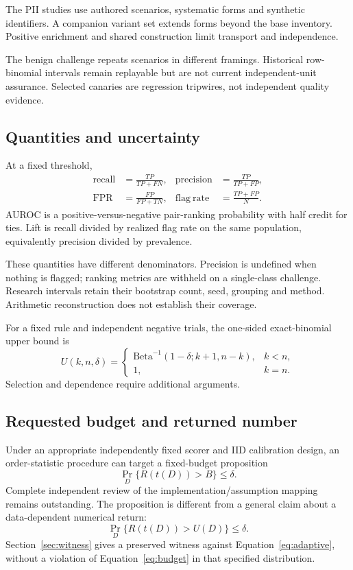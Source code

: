 The PII studies use authored scenarios, systematic forms and synthetic
identifiers. A companion variant set extends forms beyond the base inventory.
Positive enrichment and shared construction limit transport and independence.

The benign challenge repeats scenarios in different framings. Historical
row-binomial intervals remain replayable but are not current independent-unit
assurance. Selected canaries are regression tripwires, not independent quality
evidence.

\subsection{Quantities and uncertainty}
At a fixed threshold,
\begin{align}
\mathrm{recall}&=\frac{TP}{TP+FN},&
\mathrm{precision}&=\frac{TP}{TP+FP},\\
\mathrm{FPR}&=\frac{FP}{FP+TN},&
\mathrm{flag\ rate}&=\frac{TP+FP}{N}.
\end{align}
AUROC is a positive-versus-negative pair-ranking probability with half credit
for ties. Lift is recall divided by realized flag rate on the same population,
equivalently precision divided by prevalence.

These quantities have different denominators. Precision is undefined when
nothing is flagged; ranking metrics are withheld on a single-class challenge.
Research intervals retain their bootstrap count, seed, grouping and method.
Arithmetic reconstruction does not establish their coverage.

For a fixed rule and independent negative trials, the one-sided exact-binomial
upper bound is
\begin{equation}
U(k,n,\delta)=
\begin{cases}
\mathrm{Beta}^{-1}(1-\delta;k+1,n-k),&k<n,\\
1,&k=n.
\end{cases}
\end{equation}
Selection and dependence require additional arguments.

\subsection{Requested budget and returned number}
Under an appropriate independently fixed scorer and IID calibration design, an
order-statistic procedure can target a fixed-budget proposition
\begin{equation}
\Pr_D\{R(t(D))>B\}\leq\delta.
\label{eq:budget}
\end{equation}
Complete independent review of the implementation/assumption mapping remains
outstanding. The proposition is different from a general claim about a
data-dependent numerical return:
\begin{equation}
\Pr_D\{R(t(D))>U(D)\}\leq\delta.
\label{eq:adaptive}
\end{equation}
Section~\ref{sec:witness} gives a preserved witness against
Equation~\ref{eq:adaptive}, without a violation of Equation~\ref{eq:budget}
in that specified distribution.

